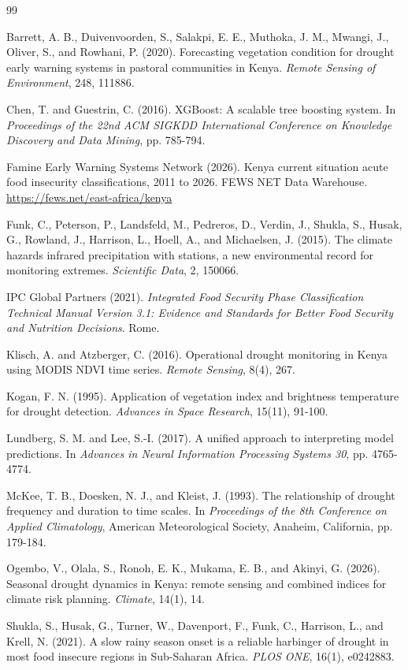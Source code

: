 \documentclass[11pt]{article}
\begin{document}
\begin{thebibliography}{99}

Barrett, A. B., Duivenvoorden, S., Salakpi, E. E., Muthoka, J. M., Mwangi, J.,
Oliver, S., and Rowhani, P. (2020). Forecasting vegetation condition for drought
early warning systems in pastoral communities in Kenya. \textit{Remote Sensing
of Environment}, 248, 111886.

Chen, T. and Guestrin, C. (2016). XGBoost: A scalable tree boosting system. In
\textit{Proceedings of the 22nd ACM SIGKDD International Conference on Knowledge
Discovery and Data Mining}, pp. 785-794.

Famine Early Warning Systems Network (2026). Kenya current situation acute food
insecurity classifications, 2011 to 2026. FEWS NET Data Warehouse.
\url{https://fews.net/east-africa/kenya}

Funk, C., Peterson, P., Landsfeld, M., Pedreros, D., Verdin, J., Shukla, S.,
Husak, G., Rowland, J., Harrison, L., Hoell, A., and Michaelsen, J. (2015). The
climate hazards infrared precipitation with stations, a new environmental record
for monitoring extremes. \textit{Scientific Data}, 2, 150066.

IPC Global Partners (2021). \textit{Integrated Food Security Phase
Classification Technical Manual Version 3.1: Evidence and Standards for Better
Food Security and Nutrition Decisions}. Rome.

Klisch, A. and Atzberger, C. (2016). Operational drought monitoring in Kenya
using MODIS NDVI time series. \textit{Remote Sensing}, 8(4), 267.

Kogan, F. N. (1995). Application of vegetation index and brightness temperature
for drought detection. \textit{Advances in Space Research}, 15(11), 91-100.

Lundberg, S. M. and Lee, S.-I. (2017). A unified approach to interpreting model
predictions. In \textit{Advances in Neural Information Processing Systems 30},
pp. 4765-4774.

McKee, T. B., Doesken, N. J., and Kleist, J. (1993). The relationship of drought
frequency and duration to time scales. In \textit{Proceedings of the 8th
Conference on Applied Climatology}, American Meteorological Society, Anaheim,
California, pp. 179-184.

Ogembo, V., Olala, S., Ronoh, E. K., Mukama, E. B., and Akinyi, G. (2026).
Seasonal drought dynamics in Kenya: remote sensing and combined indices for
climate risk planning. \textit{Climate}, 14(1), 14.

Shukla, S., Husak, G., Turner, W., Davenport, F., Funk, C., Harrison, L., and
Krell, N. (2021). A slow rainy season onset is a reliable harbinger of drought in
most food insecure regions in Sub-Saharan Africa. \textit{PLOS ONE}, 16(1),
e0242883.

\end{thebibliography}
\end{document}
